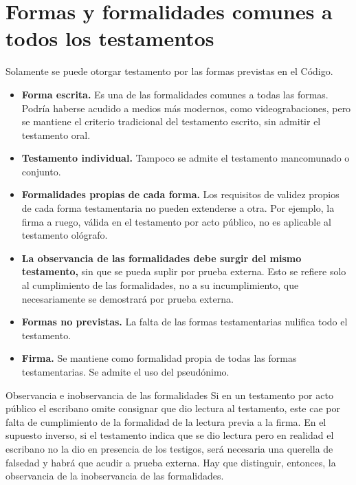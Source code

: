 \documentclass[12pt,oneside]{book}
\begin{document}
\section{Formas y formalidades comunes a todos los testamentos}

Solamente se puede otorgar testamento por las formas previstas en el Código.

\begin{itemize}
    \item \textbf{Forma escrita.} Es una de las formalidades comunes a todas las formas. Podría haberse acudido a medios más modernos, como videograbaciones, pero se mantiene el criterio tradicional del testamento escrito, sin admitir el testamento oral.
    \item \textbf{Testamento individual.} Tampoco se admite el testamento mancomunado o conjunto.
    \item \textbf{Formalidades propias de cada forma.} Los requisitos de validez propios de cada forma testamentaria no pueden extenderse a otra. Por ejemplo, la firma a ruego, válida en el testamento por acto público, no es aplicable al testamento ológrafo.
    \item \textbf{La observancia de las formalidades debe surgir del mismo testamento,} sin que se pueda suplir por prueba externa. Esto se refiere solo al cumplimiento de las formalidades, no a su incumplimiento, que necesariamente se demostrará por prueba externa.
    \item \textbf{Formas no previstas.} La falta de las formas testamentarias nulifica todo el testamento.
    \item \textbf{Firma.} Se mantiene como formalidad propia de todas las formas testamentarias. Se admite el uso del pseudónimo.
\end{itemize}

\begin{example}{Observancia e inobservancia de las formalidades}
Si en un testamento por acto público el escribano omite consignar que dio lectura al testamento, este cae por falta de cumplimiento de la formalidad de la lectura previa a la firma. En el supuesto inverso, si el testamento indica que se dio lectura pero en realidad el escribano no la dio en presencia de los testigos, será necesaria una querella de falsedad y habrá que acudir a prueba externa. Hay que distinguir, entonces, la observancia de la inobservancia de las formalidades.
\end{example}
\end{document}

